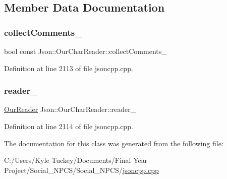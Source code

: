 \subsection{Member Data Documentation}
\mbox{\label{class_json_1_1_our_char_reader_aa6afd3d0f754cadad0f6d2be38bcfee0}} 
\subsubsection{\texorpdfstring{collect\+Comments\+\_\+}{collectComments\_}}
{\footnotesize\ttfamily bool const Json\+::\+Our\+Char\+Reader\+::collect\+Comments\+\_\+\hspace{0.3cm}{\ttfamily [private]}}



Definition at line 2113 of file jsoncpp.\+cpp.

\mbox{\label{class_json_1_1_our_char_reader_aedd4520b8570654ed7aa0726075ee58d}} 
\subsubsection{\texorpdfstring{reader\+\_\+}{reader\_}}
{\footnotesize\ttfamily \hyperlink{class_json_1_1_our_reader}{Our\+Reader} Json\+::\+Our\+Char\+Reader\+::reader\+\_\+\hspace{0.3cm}{\ttfamily [private]}}



Definition at line 2114 of file jsoncpp.\+cpp.



The documentation for this class was generated from the following file\+:\begin{DoxyCompactItemize}
\item 
C\+:/\+Users/\+Kyle Tuckey/\+Documents/\+Final Year Project/\+Social\+\_\+\+N\+P\+C\+S/\+Social\+\_\+\+N\+P\+C\+S/\hyperlink{jsoncpp_8cpp}{jsoncpp.\+cpp}\end{DoxyCompactItemize}
